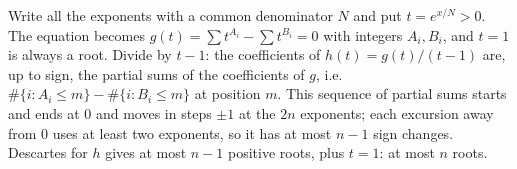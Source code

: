 \documentclass[11pt,a4paper]{article}
\begin{document}
 Write all the exponents with a common denominator $N$ and put $t=e^{x/N}>0$. The equation becomes $g(t)=\sum t^{A_i}-\sum t^{B_i}=0$ with integers $A_i,B_i$, and $t=1$ is always a root.
 Divide by $t-1$: the coefficients of $h(t)=g(t)/(t-1)$ are, up to sign, the partial sums of the coefficients of $g$, i.e.\ $\#\{i:A_i\le m\}-\#\{i:B_i\le m\}$ at position $m$.
 This sequence of partial sums starts and ends at $0$ and moves in steps $\pm1$ at the $2n$ exponents; each excursion away from $0$ uses at least two exponents, so it has at most $n-1$ sign changes. Descartes for $h$ gives at most $n-1$ positive roots, plus $t=1$: at most $n$ roots.
\end{document}
